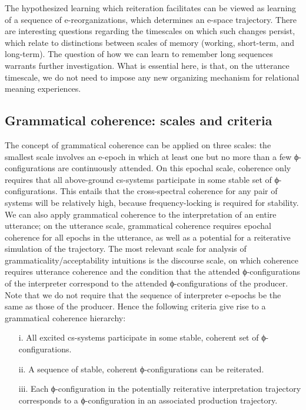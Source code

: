   The hypothesized learning which reiteration facilitates can be viewed as learning of a sequence of e-reorganizations, which determines an e-space trajectory. There are interesting questions regarding the timescales on which such changes persist, which relate to distinctions between scales of memory (working, short-term, and long-term). The question of how we can learn to remember long sequences warrants further investigation. What is essential here, is that, on the utterance timescale, we do not need to impose any new organizing mechanism for relational meaning experiences. 

\subsection{Grammatical coherence: scales and criteria}

The concept of grammatical coherence can be applied on three scales: the smallest scale involves an e-epoch in which at least one but no more than a few ϕ-configurations are continuously attended. On this epochal scale, coherence only requires that all above-ground cs-systems participate in some stable set of ϕ-configurations. This entails that the cross-spectral coherence for any pair of systems will be relatively high, because frequency-locking is required for stability. We can also apply grammatical coherence to the interpretation of an entire utterance; on the utterance scale, grammatical coherence requires epochal coherence for all epochs in the utterance, as well as a potential for a reiterative simulation of the trajectory. The most relevant scale for analysis of grammaticality/acceptability intuitions is the discourse scale, on which coherence requires utterance coherence and the condition that the attended ϕ-configurations of the interpreter correspond to the attended ϕ-configurations of the producer. Note that we do not require that the sequence of interpreter e-epochs be the same as those of the producer. Hence the following criteria give rise to a grammatical coherence hierarchy:

\begin{itemize}
\item[i.] 
All excited cs-systems participate in some stable, coherent set of ϕ-configurations.
\item[ii.] 
A sequence of stable, coherent ϕ-configurations can be reiterated.
\item[iii.] 
Each ϕ-configuration in the potentially reiterative interpretation trajectory corresponds to a ϕ-configuration in an associated production trajectory.
\end{itemize}

